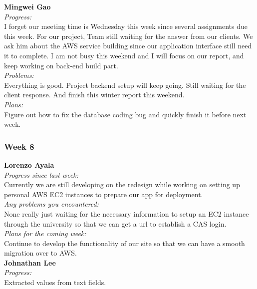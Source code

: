 \noindent\textbf{Mingwei Gao}\\
\noindent\textit{Progress:}\\
I forget our meeting time is Wednesday this week since several assignments due this week. For our project, Team still waiting for the answer from our clients. We ask him about the AWS service building since our application interface still need it to complete. I am not busy this weekend and I will focus on our report, and keep working on back-end build part.\\

\noindent\textit{Problems:}\\
\noindent  Everything is good. Project backend setup will keep going. Still waiting for the client response. And finish this winter report this weekend.\\

\noindent\textit{Plans:}\\
\noindent Figure out how to fix the database coding bug and quickly finish it before next week.\\

\subsubsection{Week 8}

\textbf{Lorenzo Ayala}\\
\noindent\textit{Progress since last week:}\\
Currently we are still developing on the redesign while working on setting up personal AWS EC2 instances to prepare our app for deployment.\\

\noindent\textit{Any problems you encountered:}\\
\noindent None really just waiting for the necessary information to setup an EC2 instance through the university so that we can get a url to establish a CAS login. \\

\noindent\textit{Plans for the coming week:}\\
\noindent Continue to develop the functionality of our site so that we can have a smooth migration over to AWS.\\

\noindent\textbf{Johnathan Lee}\\
\noindent\textit{Progress:}\\
Extracted values from text fields. \\ 

